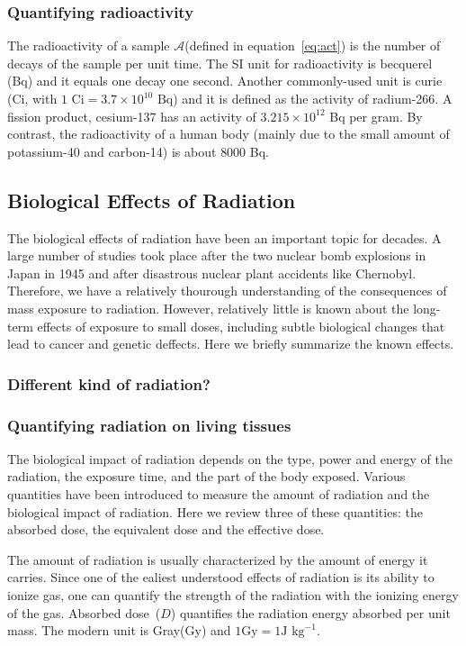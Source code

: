 \documentclass[preprint,aip,cha]{revtex4-1}
\begin{document}
        \subsubsection{Quantifying radioactivity}
        The radioactivity of a sample $\mathcal{A}$(defined in equation~\ref{eq:act}) 
        is the number of decays of the sample per unit time. The SI
        unit for radioactivity is becquerel (Bq) and it equals one decay one second. Another commonly-used
        unit is curie (Ci, with $1\text{ Ci}=3.7\times 10^{10}\text{ Bq}$) and it is defined as
        the activity of radium-266. A fission product, cesium-137 has an activity of $3.215\times 10^{12}$ Bq
        per gram. By contrast, the radioactivity of a human body (mainly due to the small amount of 
        potassium-40 and carbon-14) is about $8000$ Bq.

    \subsection{Biological Effects of Radiation}
        The biological effects of radiation have been an important topic for decades. A large
        number of studies took place after the two nuclear bomb explosions in Japan in 1945
        and after disastrous nuclear plant accidents like Chernobyl. Therefore, we have a relatively
        thourough understanding of the consequences of mass exposure to radiation. However, relatively
        little is known about the long-term effects of exposure to small doses, including subtle biological
        changes that lead to cancer and genetic deffects. Here we briefly summarize the known effects.
        \subsubsection{Different kind of radiation?}
        \subsubsection{Quantifying radiation on living tissues}
        The biological impact of radiation depends on the type, power and energy of the radiation, the
        exposure time, and the part of the body exposed. Various quantities have been introduced to
        measure the amount of radiation and the biological impact of radiation. Here we review three
        of these quantities: the absorbed dose, the equivalent dose and the effective dose.

        The amount of radiation is usually characterized by the amount of energy it carries. Since one of
        the ealiest understood effects of radiation is its ability to ionize gas, one can quantify the
        strength of the radiation with the ionizing energy of the gas.
        Absorbed dose~($D$) quantifies the 
        radiation energy absorbed per unit mass. The modern unit is Gray(Gy)
        and $1\text{Gy}=1\text{J kg}^{-1}$.\cite{u16}
\end{document}
